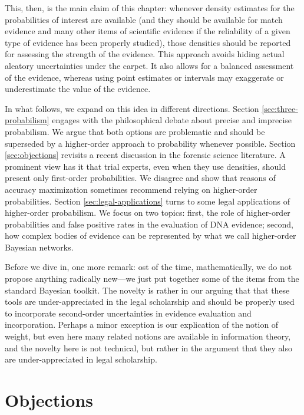 \documentclass[
  10pt,
  dvipsnames,enabledeprecatedfontcommands]{scrartcl}
\begin{document}
This, then, is the main claim of this chapter: whenever density
estimates for the probabilities of interest are available (and they
should be available for match evidence and many other items of
scientific evidence if the reliability of a given type of evidence has
been properly studied), those densities should be reported for assessing
the strength of the evidence. This approach avoids hiding actual
aleatory uncertainties under the carpet. It also allows for a balanced
assessment of the evidence, whereas using point estimates or intervals
may exaggerate or underestimate the value of the evidence.

In what follows, we expand on this idea in different directions. Section
\ref{sec:three-probabilism} engages with the philosophical debate about
precise and imprecise probabilism. We argue that both options are
problematic and should be superseded by a higher-order approach to
probability whenever possible. Section \ref{sec:objections} revisits a
recent discussion in the forensic science literature. A prominent view
has it that trial experts, even when they use densities, should present
only first-order probabilities. We disagree and show that reasons of
accuracy maximization sometimes recommend relying on higher-order
probabilities. Section \ref{sec:legal-applications} turns to some legal
applications of higher-order probabilism. We focus on two topics: first,
the role of higher-order probabilities and false positive rates in the
evaluation of DNA evidence; second, how complex bodies of evidence can
be represented by what we call higher-order Bayesian networks.

Before we dive in, one more remark: ost of the time, mathematically, we
do not propose anything radically new---we just put together some of the
items from the standard Bayesian toolkit. The novelty is rather in our
arguing that that these tools are under-appreciated in the legal
scholarship and should be properly used to incorporate second-order
uncertainties in evidence evaluation and incorporation. Perhaps a minor
exception is our explication of the notion of weight, but even here many
related notions are available in information theory, and the novelty
here is not technical, but rather in the argument that they also are
under-appreciated in legal scholarship.

\hypertarget{objections}{%
\section{Objections}\label{objections}}
\end{document}
